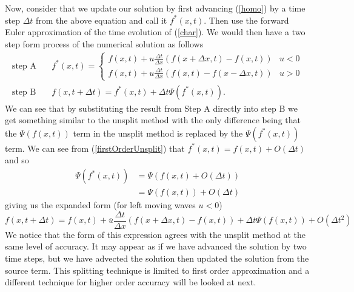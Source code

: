 Now, consider that we update our solution by first advancing (\ref{homo}) by a time step $\Delta t$ from the above equation and call it $f^*(x,t)$. Then use the forward Euler approximation of the time evolution of (\ref{char}). We would then have a two step form process of the numerical solution as follows
%
\begin{align*}
\text{step A}& \quad f^*(x,t) = \left\{ \begin{array}{cl} f(x,t) + u \frac{\Delta t}{\Delta x} \left(f(x+\Delta x,t) - f(x,t)\right) & u<0\\
f(x,t) + u \frac{\Delta t}{\Delta x} \left(f(x,t) - f(x - \Delta x,t)\right) & u>0 \end{array} \right.\\
\text{step B}& \quad f(x,t+\Delta t) = f^*(x,t) + \Delta t \Psi(f^*(x,t)).
\end{align*}
%
We can see that by substituting the result from Step A directly into step B we get something similar to the unsplit method with the only difference being that the $\Psi(f(x,t))$ term in the unsplit method is replaced by the $\Psi(f^*(x,t))$ term. We can see from (\ref{firstOrderUnsplit}) that $f^*(x,t) = f(x,t) + O(\Delta t)$ and so
%
\begin{align*}
\Psi(f^*(x,t)) &= \Psi \left(f(x,t) + O(\Delta t) \right)\\
&= \Psi \left(f(x,t) \right) + O(\Delta t)
\end{align*}
%
giving us the expanded form (for left moving waves $u<0$)
%
\begin{equation*}
f(x,t+\Delta t) = f(x,t) + \bar{u} \frac{\Delta t}{\Delta x} \left(f(x+\Delta x,t) - f(x,t)\right) + \Delta t \Psi(f(x,t)) + O(\Delta t^2)
\end{equation*}
%
We notice that the form of this expression agrees with the unsplit method at the same level of accuracy. It may appear as if we have advanced the solution by two time steps, but we have advected the solution then updated the solution from the source term. This splitting technique is limited to first order approximation and a different technique for higher order accuracy will be looked at next.
